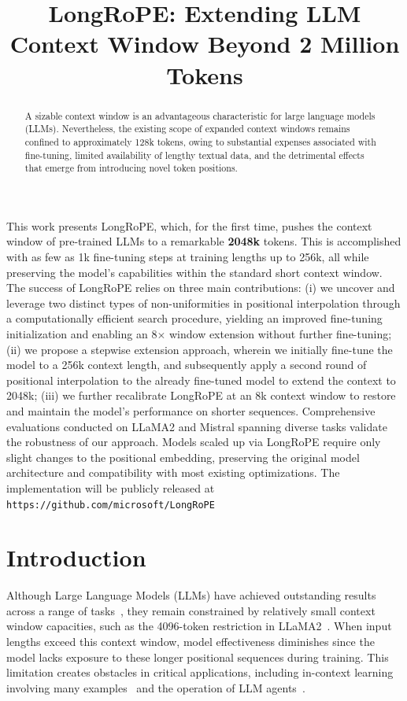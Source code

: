 \title{LongRoPE: Extending LLM Context Window Beyond 2 Million Tokens}

\begin{abstract}
A sizable context window is an advantageous characteristic for large language models (LLMs). Nevertheless, the existing scope of expanded context windows remains confined to approximately 128k tokens, owing to substantial expenses associated with fine-tuning, limited availability of lengthy textual data, and the detrimental effects that emerge from introducing novel token positions.
\end{abstract}

This work presents LongRoPE, which, for the first time, pushes the context window of pre-trained LLMs to a remarkable \textbf{2048k} tokens. This is accomplished with as few as 1k fine-tuning steps at training lengths up to 256k, all while preserving the model’s capabilities within the standard short context window. The success of LongRoPE relies on three main contributions: (i) we uncover and leverage two distinct types of non-uniformities in positional interpolation through a computationally efficient search procedure, yielding an improved fine-tuning initialization and enabling an 8$\times$ window extension without further fine-tuning; (ii) we propose a stepwise extension approach, wherein we initially fine-tune the model to a 256k context length, and subsequently apply a second round of positional interpolation to the already fine-tuned model to extend the context to 2048k; (iii) we further recalibrate LongRoPE at an 8k context window to restore and maintain the model’s performance on shorter sequences. Comprehensive evaluations conducted on LLaMA2 and Mistral spanning diverse tasks validate the robustness of our approach. Models scaled up via LongRoPE require only slight changes to the positional embedding, preserving the original model architecture and compatibility with most existing optimizations. The implementation will be publicly released at \texttt{https://github.com/microsoft/LongRoPE}

\section{Introduction}

Although Large Language Models (LLMs) have achieved outstanding results across a range of tasks~\cite{gpt4,llama2}, they remain constrained by relatively small context window capacities, such as the 4096-token restriction in LLaMA2~\cite{llama2}. When input lengths exceed this context window, model effectiveness diminishes since the model lacks exposure to these longer positional sequences during training. This limitation creates obstacles in critical applications, including in-context learning involving many examples~\cite{Huang2023FewerIM} and the operation of LLM agents~\cite{park2023generative,madaan2023selfrefine}.

